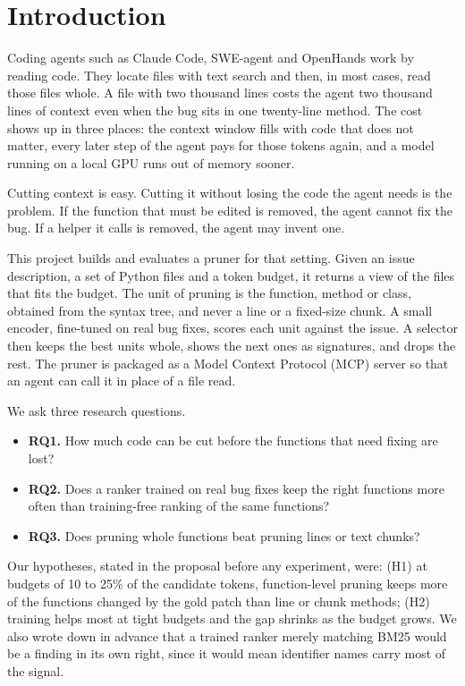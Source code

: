 \section{Introduction}

Coding agents such as Claude Code, SWE-agent and OpenHands work by reading code. They locate files with text search and then, in most cases, read those files whole. A file with two thousand lines costs the agent two thousand lines of context even when the bug sits in one twenty-line method. The cost shows up in three places: the context window fills with code that does not matter, every later step of the agent pays for those tokens again, and a model running on a local GPU runs out of memory sooner.

Cutting context is easy. Cutting it without losing the code the agent needs is the problem. If the function that must be edited is removed, the agent cannot fix the bug. If a helper it calls is removed, the agent may invent one.

This project builds and evaluates a pruner for that setting. Given an issue description, a set of Python files and a token budget, it returns a view of the files that fits the budget. The unit of pruning is the function, method or class, obtained from the syntax tree, and never a line or a fixed-size chunk. A small encoder, fine-tuned on real bug fixes, scores each unit against the issue. A selector then keeps the best units whole, shows the next ones as signatures, and drops the rest. The pruner is packaged as a Model Context Protocol (MCP) server so that an agent can call it in place of a file read.

We ask three research questions.

\begin{itemize}
\item \textbf{RQ1.} How much code can be cut before the functions that need fixing are lost?
\item \textbf{RQ2.} Does a ranker trained on real bug fixes keep the right functions more often than training-free ranking of the same functions?
\item \textbf{RQ3.} Does pruning whole functions beat pruning lines or text chunks?
\end{itemize}

Our hypotheses, stated in the proposal before any experiment, were: (H1) at budgets of 10 to 25\% of the candidate tokens, function-level pruning keeps more of the functions changed by the gold patch than line or chunk methods; (H2) training helps most at tight budgets and the gap shrinks as the budget grows. We also wrote down in advance that a trained ranker merely matching BM25 would be a finding in its own right, since it would mean identifier names carry most of the signal.

